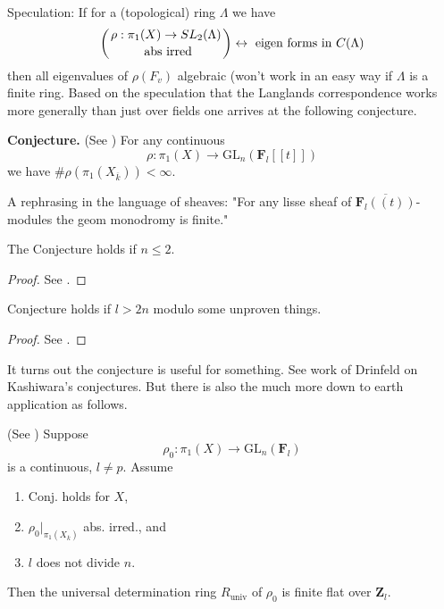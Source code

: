 \noindent
Speculation: If for a (topological) ring $\Lambda$ we have
$$
\left(
{\rho : \pi_1(X)\to SL_2(\Lambda) \atop \text{ abs irred}}
\right)
\leftrightarrow
\text{ eigen forms in } C(\Lambda)
$$
then all eigenvalues of $\rho(F_v)$ algebraic (won't work in an easy
way if $\Lambda$ is a finite ring. Based on the speculation that the
Langlands correspondence works more generally than just over fields
one arrives at the following conjecture.

\medskip\noindent
{\bf Conjecture.}
(See \cite{dJ-conjecture})
For any continuous
$$
\rho : \pi_1(X)\to \text{GL}_n(\mathbf{F}_l[[t]])
$$
we have $\# \rho(\pi_1(X_{\overline{k}}))<\infty$.

\medskip\noindent
A rephrasing in the language of sheaves:
"For any lisse sheaf of $\overline{\mathbf{F}_l((t))}$-modules the geom
monodromy is finite."

\begin{theorem}
\label{theorem-conjecture-n-2}
The Conjecture holds if $n\leq 2$.
\end{theorem}

\begin{proof}
See \cite{dJ-conjecture}.
\end{proof}

\begin{theorem}
\label{theorem-conjecture-l-bigger-2n}
Conjecture holds if $l>2n$ modulo some unproven things.
\end{theorem}

\begin{proof}
See \cite{Gaitsgory}.
\end{proof}

\noindent
It turns out the conjecture is useful for something.
See work of Drinfeld on Kashiwara's conjectures. But there is also
the much more down to earth application as follows.

\begin{theorem}
\label{theorem-deformation-rings}
(See \cite[Theorem 3.5]{dJ-conjecture})
Suppose
$$
\rho_0: \pi_1(X)\to \text{GL}_n(\mathbf{F}_l)
$$
is a continuous, $l\neq p$. Assume
\begin{enumerate}
\item Conj. holds for $X$,
\item $\rho_0 |_{\pi_1(X_{\overline{k}})}$ abs. irred., and
\item $l$ does not divide $n$.
\end{enumerate}
Then the universal determination ring $R_{\text{univ}}$ of $\rho_0$ is
finite flat over $\mathbf{Z}_l$.
\end{theorem}

